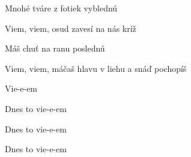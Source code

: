 \begin{song}
\bigskip

 Mnohé tváre z fotiek vyblednú \par
Viem, viem, osud zavesí na nás kríž  \par
{} Máš chuť na ranu poslednú \par
Viem, viem, máčaš hlavu v liehu a snáď pochopíš \par

\bigskip

\PredrefrenARefren

\bigskip

Vie-e-em \par
Dnes to vie-e-em \par
Dnes to vie-e-em \par
Dnes to vie-e-em \par

\end{song}
